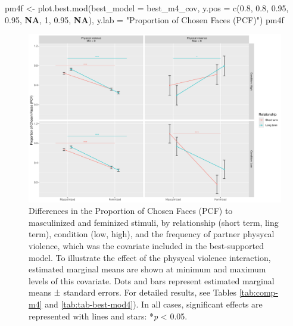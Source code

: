 \documentclass[
  bookmarksnumbered]{article}
\newenvironment{Shaded}{\begin{snugshade}}{\end{snugshade}}
\newcommand{\AttributeTok}[1]{\textcolor[rgb]{0.80,0.80,0.80}{#1}}
\newcommand{\ConstantTok}[1]{\textcolor[rgb]{0.86,0.64,0.64}{\textbf{#1}}}
\newcommand{\DecValTok}[1]{\textcolor[rgb]{0.86,0.86,0.80}{#1}}
\newcommand{\FloatTok}[1]{\textcolor[rgb]{0.75,0.75,0.82}{#1}}
\newcommand{\FunctionTok}[1]{\textcolor[rgb]{0.94,0.94,0.56}{#1}}
\newcommand{\NormalTok}[1]{\textcolor[rgb]{0.80,0.80,0.80}{#1}}
\newcommand{\OtherTok}[1]{\textcolor[rgb]{0.94,0.94,0.56}{#1}}
\newcommand{\StringTok}[1]{\textcolor[rgb]{0.80,0.58,0.58}{#1}}
\begin{document}
\begin{Shaded}
\begin{Highlighting}[]
\NormalTok{pm4f }\OtherTok{\textless{}{-}} \FunctionTok{plot.best.mod}\NormalTok{(}\AttributeTok{best\_model =}\NormalTok{ best\_m4\_cov, }
                      \AttributeTok{y.pos =} \FunctionTok{c}\NormalTok{(}\FloatTok{0.8}\NormalTok{, }\FloatTok{0.8}\NormalTok{, }\FloatTok{0.95}\NormalTok{, }\FloatTok{0.95}\NormalTok{, }\ConstantTok{NA}\NormalTok{, }\DecValTok{1}\NormalTok{, }\FloatTok{0.95}\NormalTok{, }\ConstantTok{NA}\NormalTok{),}
                      \AttributeTok{y.lab =} \StringTok{"Proportion of Chosen Faces (PCF)"}\NormalTok{)}
\NormalTok{pm4f}
\end{Highlighting}
\end{Shaded}

\begin{figure}
\centering
\includegraphics{Supplementary_material_files/figure-latex/fig-mod4-cov-1.pdf}
\caption{\label{fig:fig-mod4-cov}Differences in the Proportion of Chosen Faces (PCF) to masculinized and feminized stimuli, by relationship (short term, ling term), condition (low, high), and the frequency of partner physycal violence, which was the covariate included in the best-supported model. To illustrate the effect of the physycal violence interaction, estimated marginal means are shown at minimum and maximum levels of this covariate. Dots and bars represent estimated marginal means ± standard errors. For detailed results, see Tables \ref{tab:comp-m4} and \ref{tab:tab-best-mod4}). In all cases, significant effects are represented with lines and stars: *\emph{p} \textless{} 0.05.}
\end{figure}
\end{document}

